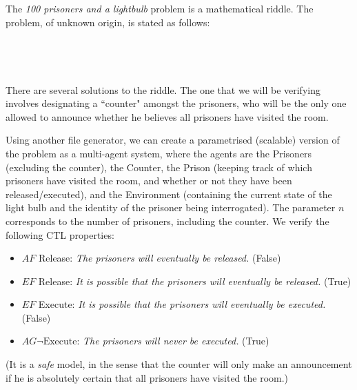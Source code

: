 \documentclass[11pt]{report}
\begin{document}
The \textit{100 prisoners and a lightbulb} problem is a mathematical riddle. The problem, of unknown origin, is stated as follows:
\\\\
\\\\\\
There are several solutions to the riddle. The one that we will be verifying involves designating a ``counter" amongst the prisoners, who will be the only one allowed to announce whether he believes all prisoners have visited the room.

Using another file generator, we can create a parametrised (scalable) version of the problem as a multi-agent system, where the agents are the Prisoners (excluding the counter), the Counter, the Prison (keeping track of which prisoners have visited the room, and whether or not they have been released/executed), and the Environment (containing the current state of the light bulb and the identity of the prisoner being interrogated). The parameter $n$ corresponds to the number of prisoners, including the counter. We verify the following CTL properties: 
\begin{itemize}
\item $AF$ Release: \textit{The prisoners will eventually be released.} (False)
\item $EF$ Release: \textit{It is possible that the prisoners will eventually be released.} (True)
\item $EF$ Execute: \textit{It is possible that the prisoners will eventually be executed.} (False)
\item $AG \lnot\mbox{Execute}$: \textit{The prisoners will never be executed.} (True)
\end{itemize}
(It is a \textit{safe} model, in the sense that the counter will only make an announcement if he is absolutely certain that all prisoners have visited the room.)
\\\\
\end{document}
